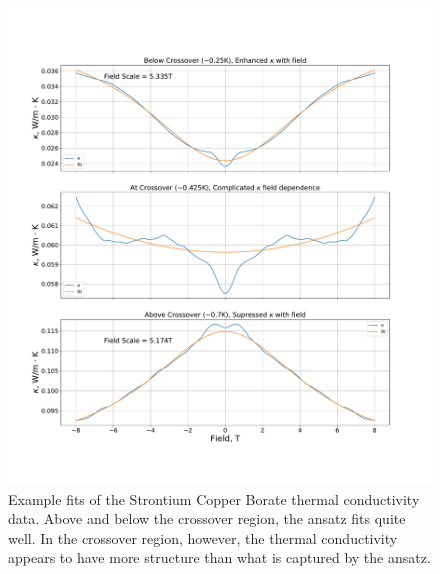 \documentclass{thesis-umich}
\begin{document}
\begin{figure}
	\caption[Example fits of SCBO data.]{Example fits of the Strontium Copper Borate thermal conductivity data. Above and below the crossover region, the ansatz fits quite well. In the crossover region, however, the thermal conductivity appears to have more structure than what is captured by the ansatz.}
	\label{fig:SCBO_example_fits}
	\includegraphics[width=\columnwidth]{figures/SCBO_kappa_vs_b_fits.pdf}
\end{figure}
\end{document}
